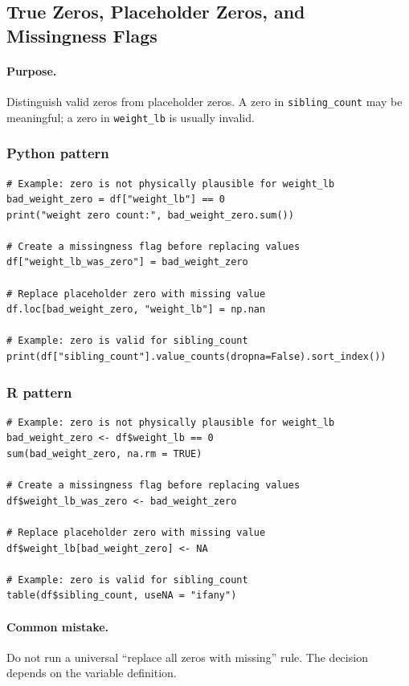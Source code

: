 \subsection{True Zeros, Placeholder Zeros, and Missingness Flags}
\label{app:ch03-software-cookbook-zeros-and-flags}

\paragraph{Purpose.} Distinguish valid zeros from placeholder zeros.  A zero in \texttt{sibling\_count} may be meaningful; a zero in \texttt{weight\_lb} is usually invalid.

\subsubsection*{Python pattern}

\begin{verbatim}
# Example: zero is not physically plausible for weight_lb
bad_weight_zero = df["weight_lb"] == 0
print("weight zero count:", bad_weight_zero.sum())

# Create a missingness flag before replacing values
df["weight_lb_was_zero"] = bad_weight_zero

# Replace placeholder zero with missing value
df.loc[bad_weight_zero, "weight_lb"] = np.nan

# Example: zero is valid for sibling_count
print(df["sibling_count"].value_counts(dropna=False).sort_index())
\end{verbatim}

\subsubsection*{R pattern}

\begin{verbatim}
# Example: zero is not physically plausible for weight_lb
bad_weight_zero <- df$weight_lb == 0
sum(bad_weight_zero, na.rm = TRUE)

# Create a missingness flag before replacing values
df$weight_lb_was_zero <- bad_weight_zero

# Replace placeholder zero with missing value
df$weight_lb[bad_weight_zero] <- NA

# Example: zero is valid for sibling_count
table(df$sibling_count, useNA = "ifany")
\end{verbatim}

\paragraph{Common mistake.} Do not run a universal ``replace all zeros with missing'' rule.  The decision depends on the variable definition.

